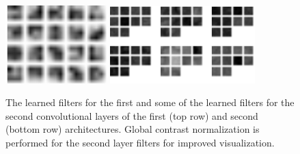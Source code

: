 \documentclass[5pt]{article}
\begin{document}
\begin{figure}[T]
  \centering{}

  \vspace{0.5cm}
  \includegraphics[width=0.35\textwidth]{images/mnist_kernels21.png}
  \includegraphics[width=0.5\textwidth]{images/mnist_kernels22.png}
  \caption{The learned filters for the first and some of the learned filters
  for the second convolutional layers of the first (top row) and second
  (bottom row) architectures. Global contrast normalization is performed for
  the second layer filters for improved visualization.}
\label{fig:mnist_kernels}
\end{figure}
\end{document}
